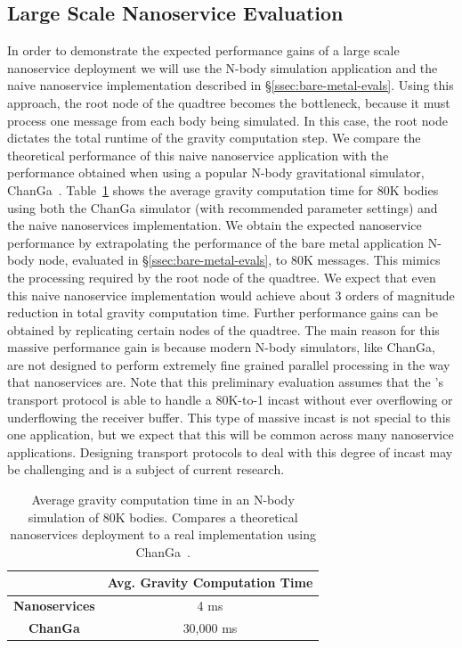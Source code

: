 \subsection{Large Scale Nanoservice Evaluation}
\label{ssec:large-eval}
In order to demonstrate the expected performance gains of a large scale nanoservice deployment we will use the N-body simulation application and the naive nanoservice implementation described in \S\ref{ssec:bare-metal-evals}.
Using this approach, the root node of the quadtree becomes the bottleneck, because it must process one message from each body being simulated.
In this case, the root node dictates the total runtime of the gravity computation step.
We compare the theoretical performance of this naive nanoservice application with the performance obtained when using a popular N-body gravitational simulator, ChanGa~\cite{changa}.
Table~\ref{tab:nbody-changa} shows the average gravity computation time for 80K bodies using both the ChanGa simulator (with recommended parameter settings) and the naive nanoservices implementation.
We obtain the expected nanoservice performance by extrapolating the performance of the \name{} bare metal application N-body node, evaluated in \S\ref{ssec:bare-metal-evals}, to 80K messages.
This mimics the processing required by the root node of the quadtree.
We expect that even this naive nanoservice implementation would achieve about 3 orders of magnitude reduction in total gravity computation time.
Further performance gains can be obtained by replicating certain nodes of the quadtree.
The main reason for this massive performance gain is because modern N-body simulators, like ChanGa, are not designed to perform extremely fine grained parallel processing in the way that nanoservices are.
Note that this preliminary evaluation assumes that the \name{}'s transport protocol is able to handle a 80K-to-1 incast without ever overflowing or underflowing the receiver buffer.
This type of massive incast is not special to this one application, but we expect that this will be common across many nanoservice applications.
Designing transport protocols to deal with this degree of incast may be challenging and is a subject of current research.

\begin{table}
\begin{center}
\begin{tabular}{c|c}
                      & \textbf{Avg. Gravity Computation Time} \\ \toprule
\textbf{Nanoservices} & 4 ms                                   \\
\textbf{ChanGa}       & 30,000 ms                                 \\
\end{tabular}
\caption{Average gravity computation time in an N-body simulation of 80K bodies. Compares a theoretical nanoservices deployment to a real implementation using ChanGa~\cite{changa}.}
\label{tab:nbody-changa}
\end{center}
\end{table}